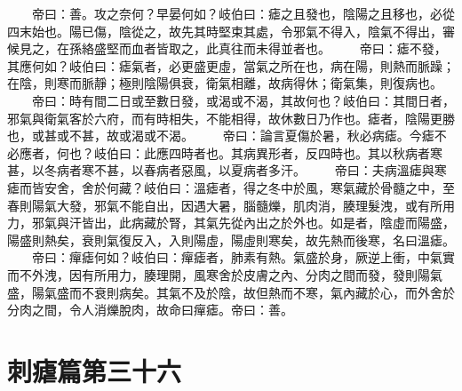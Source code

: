 　　帝曰：善。攻之奈何？早晏何如？岐伯曰：瘧之且發也，陰陽之且移也，必從四末始也。陽已傷，陰從之，故先其時堅束其處，令邪氣不得入，陰氣不得出，審候見之，在孫絡盛堅而血者皆取之，此真往而未得並者也。
　　帝曰：瘧不發，其應何如？岐伯曰：瘧氣者，必更盛更虛，當氣之所在也，病在陽，則熱而脈躁；在陰，則寒而脈靜；極則陰陽俱衰，衛氣相離，故病得休；衛氣集，則復病也。
　　帝曰：時有間二日或至數日發，或渴或不渴，其故何也？岐伯曰：其間日者，邪氣與衛氣客於六府，而有時相失，不能相得，故休數日乃作也。瘧者，陰陽更勝也，或甚或不甚，故或渴或不渴。
　　帝曰：論言夏傷於暑，秋必病瘧。今瘧不必應者，何也？岐伯曰：此應四時者也。其病異形者，反四時也。其以秋病者寒甚，以冬病者寒不甚，以春病者惡風，以夏病者多汗。
　　帝曰：夫病溫瘧與寒瘧而皆安舍，舍於何藏？岐伯曰：溫瘧者，得之冬中於風，寒氣藏於骨髓之中，至春則陽氣大發，邪氣不能自出，因遇大暑，腦髓爍，肌肉消，腠理髮洩，或有所用力，邪氣與汗皆出，此病藏於腎，其氣先從內出之於外也。如是者，陰虛而陽盛，陽盛則熱矣，衰則氣復反入，入則陽虛，陽虛則寒矣，故先熱而後寒，名曰溫瘧。
　　帝曰：癉瘧何如？岐伯曰：癉瘧者，肺素有熱。氣盛於身，厥逆上衝，中氣實而不外洩，因有所用力，腠理開，風寒舍於皮膚之內、分肉之間而發，發則陽氣盛，陽氣盛而不衰則病矣。其氣不及於陰，故但熱而不寒，氣內藏於心，而外舍於分肉之間，令人消爍脫肉，故命曰癉瘧。帝曰：善。

\section{刺瘧篇第三十六}

